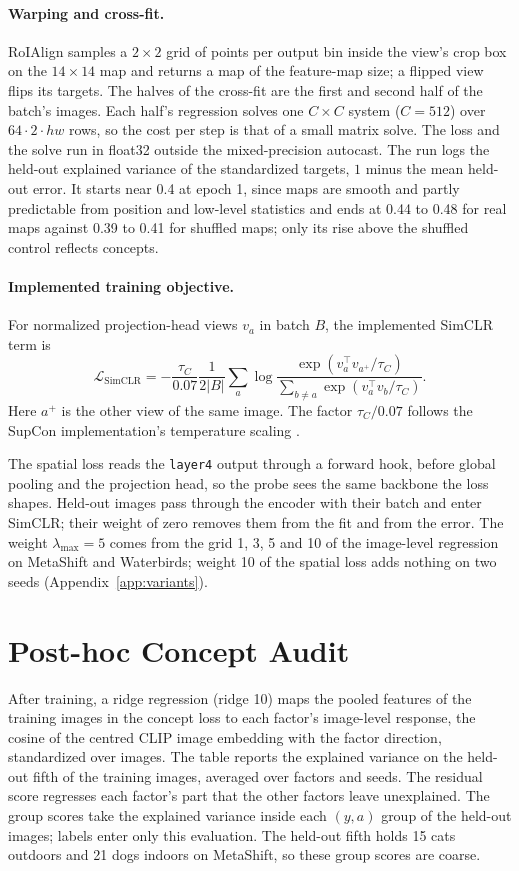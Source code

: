 \documentclass{article}
\begin{document}
\paragraph{Warping and cross-fit.}
RoIAlign samples a $2\times2$ grid of points per output bin inside the view's crop box on the $14\times14$ map and returns a map of the feature-map size; a flipped view flips its targets. The halves of the cross-fit are the first and second half of the batch's images. Each half's regression solves one $C\times C$ system ($C=512$) over $64\cdot2\cdot hw$ rows, so the cost per step is that of a small matrix solve. The loss and the solve run in float32 outside the mixed-precision autocast. The run logs the held-out explained variance of the standardized targets, $1$ minus the mean held-out error. It starts near 0.4 at epoch 1, since maps are smooth and partly predictable from position and low-level statistics and ends at 0.44 to 0.48 for real maps against 0.39 to 0.41 for shuffled maps; only its rise above the shuffled control reflects concepts.

\paragraph{Implemented training objective.}
For normalized projection-head views $v_a$ in batch $B$, the implemented SimCLR term is
\begin{equation}
\mathcal{L}_{\mathrm{SimCLR}} = -\frac{\tau_C}{0.07} \frac{1}{2|B|}
\sum_a \log
\frac{
    \exp(v_a^\top v_{a^+}/\tau_C)
}{
    \sum_{b\neq a}\exp(v_a^\top v_b/\tau_C)
}.
\end{equation}
Here $a^+$ is the other view of the same image. The factor $\tau_C/0.07$ follows the SupCon implementation's temperature scaling \citep{khosla2020supcon}.

The spatial loss reads the \texttt{layer4} output through a forward hook, before global pooling and the projection head, so the probe sees the same backbone the loss shapes. Held-out images pass through the encoder with their batch and enter SimCLR; their weight of zero removes them from the fit and from the error. The weight $\lambda_{\max}=5$ comes from the grid 1, 3, 5 and 10 of the image-level regression on MetaShift and Waterbirds; weight 10 of the spatial loss adds nothing on two seeds (Appendix~\ref{app:variants}).

\section{Post-hoc Concept Audit}\label{app:audit}
After training, a ridge regression (ridge 10) maps the pooled features of the training images in the concept loss to each factor's image-level response, the cosine of the centred CLIP image embedding with the factor direction, standardized over images. The table reports the explained variance on the held-out fifth of the training images, averaged over factors and seeds. The residual score regresses each factor's part that the other factors leave unexplained. The group scores take the explained variance inside each $(y,a)$ group of the held-out images; labels enter only this evaluation. The held-out fifth holds 15 cats outdoors and 21 dogs indoors on MetaShift, so these group scores are coarse.
\end{document}
